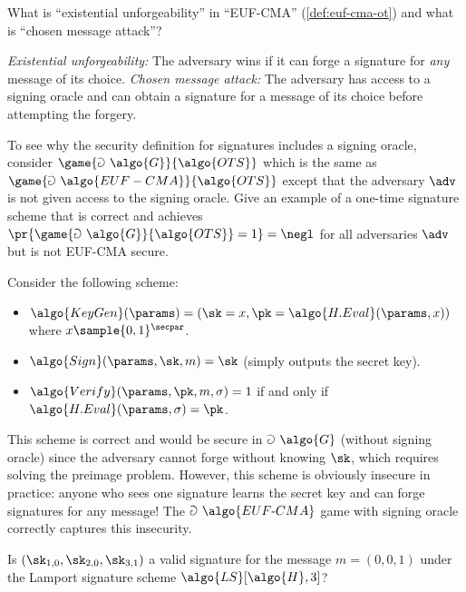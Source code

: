 \begin{exercise}
  What is ``existential unforgeability'' in ``EUF-CMA'' (\autoref{def:euf-cma-ot}) and what is ``chosen message attack''?
\end{exercise}

\ifsolutions
\begin{mysolution}
  \emph{Existential unforgeability:} The adversary wins if it can forge a signature for \emph{any} message of its choice.
  \emph{Chosen message attack:} The adversary has access to a signing oracle and can obtain a signature for a message of its choice before attempting the forgery.
\end{mysolution}
\fi

\begin{exercise}
  To see why the security definition for signatures includes a signing oracle, consider $\game{\Game~\algo{G}}{\algo{OTS}}$ which is the same as $\game{\Game~\algo{EUF-CMA}}{\algo{OTS}}$ except that the adversary $\adv$ is not given access to the signing oracle.
  Give an example of a one-time signature scheme that is correct and achieves $\pr{\game{\Game~\algo{G}}{\algo{OTS}} = 1} = \negl$ for all \ppt adversaries $\adv$ but is not EUF-CMA secure.
\end{exercise}

\ifsolutions
\begin{mysolution}
  Consider the following scheme:
  \begin{itemize}
      \item $\algo{KeyGen}(\params) = (\sk = x, \pk = \algo{H.Eval}(\params, x))$ where $x \sample \{0,1\}^\secpar$.
      \item $\algo{Sign}(\params, \sk, m) = \sk$ (simply outputs the secret key).
      \item $\algo{Verify}(\params, \pk, m, \sigma) = 1$ if and only if $\algo{H.Eval}(\params, \sigma) = \pk$.
  \end{itemize}
  This scheme is correct and would be secure in $\Game~\algo{G}$ (without signing oracle) since the adversary cannot forge without knowing $\sk$, which requires solving the preimage problem.
  However, this scheme is obviously insecure in practice: anyone who sees one signature learns the secret key and can forge signatures for any message!
  The $\Game~\algo{EUF\text{-}CMA}$ game with signing oracle correctly captures this insecurity.
\end{mysolution}
\fi

\begin{exercise}
  Is $(\sk_{1,0}, \sk_{2,0}, \sk_{3,1})$ a valid signature for the message $m = (0, 0, 1)$ under the Lamport signature scheme $\algo{LS}[\algo{H}, 3]$?
\end{exercise}

